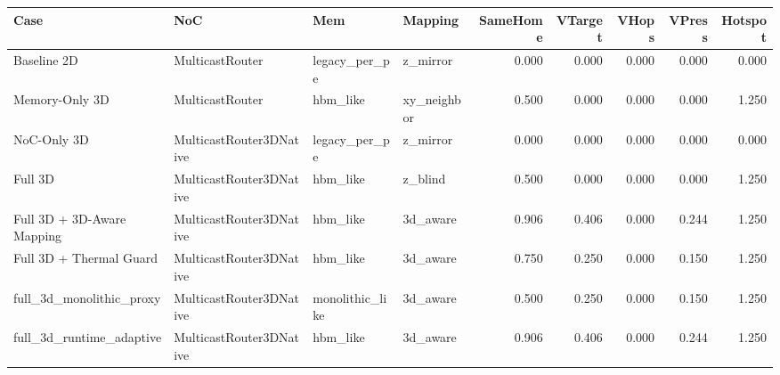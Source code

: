 \begin{tabular}{l l l l r r r r r}
\hline
Case & NoC & Mem & Mapping & SameHome & VTarget & VHops & VPress & Hotspot \\
\hline
Baseline 2D & MulticastRouter & legacy\_per\_pe & z\_mirror & 0.000 & 0.000 & 0.000 & 0.000 & 0.000 \\
Memory-Only 3D & MulticastRouter & hbm\_like & xy\_neighbor & 0.500 & 0.000 & 0.000 & 0.000 & 1.250 \\
NoC-Only 3D & MulticastRouter3DNative & legacy\_per\_pe & z\_mirror & 0.000 & 0.000 & 0.000 & 0.000 & 0.000 \\
Full 3D & MulticastRouter3DNative & hbm\_like & z\_blind & 0.500 & 0.000 & 0.000 & 0.000 & 1.250 \\
Full 3D + 3D-Aware Mapping & MulticastRouter3DNative & hbm\_like & 3d\_aware & 0.906 & 0.406 & 0.000 & 0.244 & 1.250 \\
Full 3D + Thermal Guard & MulticastRouter3DNative & hbm\_like & 3d\_aware & 0.750 & 0.250 & 0.000 & 0.150 & 1.250 \\
full\_3d\_monolithic\_proxy & MulticastRouter3DNative & monolithic\_like & 3d\_aware & 0.500 & 0.250 & 0.000 & 0.150 & 1.250 \\
full\_3d\_runtime\_adaptive & MulticastRouter3DNative & hbm\_like & 3d\_aware & 0.906 & 0.406 & 0.000 & 0.244 & 1.250 \\
\hline
\end{tabular}
